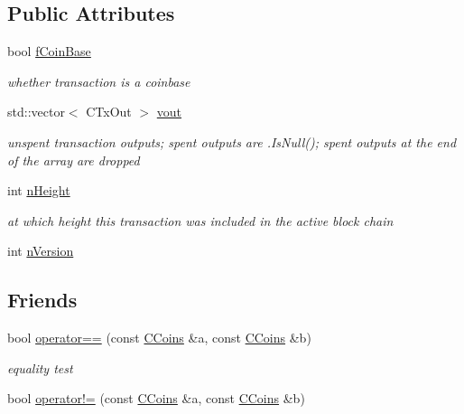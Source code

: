 \subsection*{Public Attributes}
\begin{DoxyCompactItemize}
\item 
bool \mbox{\hyperlink{class_c_coins_adeedfaef84ba39b6e295d5d1fb9d8f0b}{f\+Coin\+Base}}
\begin{DoxyCompactList}\small\item\em whether transaction is a coinbase \end{DoxyCompactList}\item 
std\+::vector$<$ C\+Tx\+Out $>$ \mbox{\hyperlink{class_c_coins_a1dcea1a6da9b25642337e286f9f59b03}{vout}}
\begin{DoxyCompactList}\small\item\em unspent transaction outputs; spent outputs are .Is\+Null(); spent outputs at the end of the array are dropped \end{DoxyCompactList}\item 
int \mbox{\hyperlink{class_c_coins_af7396dfad71367de46f21cf92e2c70ab}{n\+Height}}
\begin{DoxyCompactList}\small\item\em at which height this transaction was included in the active block chain \end{DoxyCompactList}\item 
int \mbox{\hyperlink{class_c_coins_a96fea4ee8841e9ce32f60c2e7e3cf6b6}{n\+Version}}
\end{DoxyCompactItemize}
\subsection*{Friends}
\begin{DoxyCompactItemize}
\item 
bool \mbox{\hyperlink{class_c_coins_a77593e3db3e4b369c21a91aad2afcc05}{operator==}} (const \mbox{\hyperlink{class_c_coins}{C\+Coins}} \&a, const \mbox{\hyperlink{class_c_coins}{C\+Coins}} \&b)
\begin{DoxyCompactList}\small\item\em equality test \end{DoxyCompactList}\item 
bool \mbox{\hyperlink{class_c_coins_a42ef9fcc8ca59916b5fb69904db1c9bd}{operator!=}} (const \mbox{\hyperlink{class_c_coins}{C\+Coins}} \&a, const \mbox{\hyperlink{class_c_coins}{C\+Coins}} \&b)
\end{DoxyCompactItemize}


